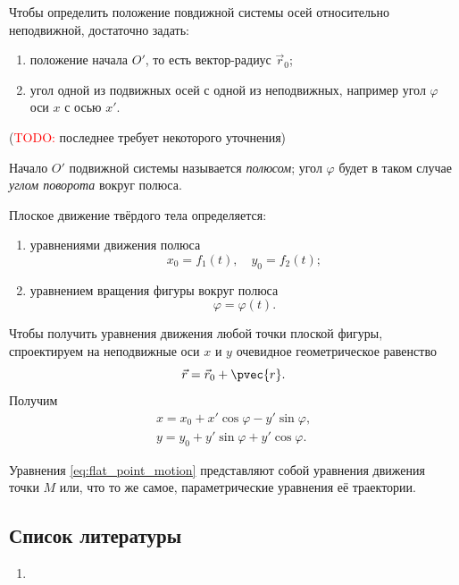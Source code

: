 Чтобы определить положение повдижной системы осей относительно неподвижной,
достаточно задать:
\begin{enumerate}
  \item положение начала $O'$, то есть вектор-радиус $\vec{r}_0$;
  \item угол одной из подвижных осей с одной из неподвижных, например угол
    $\varphi$ оси $x$ с осью $x'$.
\end{enumerate}
(\textcolor{red}{TODO:} последнее требует некоторого уточнения)

\begin{definition}
  Начало $O'$ подвижной системы называется \textit{полюсом}; угол $\varphi$ будет в
  таком случае \textit{углом поворота} вокруг полюса.
\end{definition}

Плоское движение твёрдого тела определяется:
\begin{enumerate}
  \item уравнениями движения полюса
    \begin{equation}
      x_0 = f_1(t), \quad y_0 = f_2(t);
    \end{equation}
  \item уравнением вращения фигуры вокруг полюса
    \begin{equation}
      \varphi = \varphi(t).
    \end{equation}
\end{enumerate}

Чтобы получить уравнения движения любой точки плоской фигуры, спроектируем на
неподвижные оси $x$ и $y$ очевидное геометрическое равенство
\begin{equation*}
  \vec{r} = \vec{r}_0 + \pvec{r}.
\end{equation*}
Получим
\begin{equation}
  \label{eq:flat_point_motion}
  \begin{gathered}
    x = x_0 + x' \cos\varphi - y' \sin\varphi, \\
    y = y_0 + y' \sin\varphi + y' \cos\varphi.
  \end{gathered}
\end{equation}

Уравнения \ref{eq:flat_point_motion} представляют собой уравнения движения точки
$M$ или, что то же самое, параметрические уравнения её траектории.

\subsection{Список литературы}
\begin{enumerate}
  \item \cite{lourie}
\end{enumerate}

